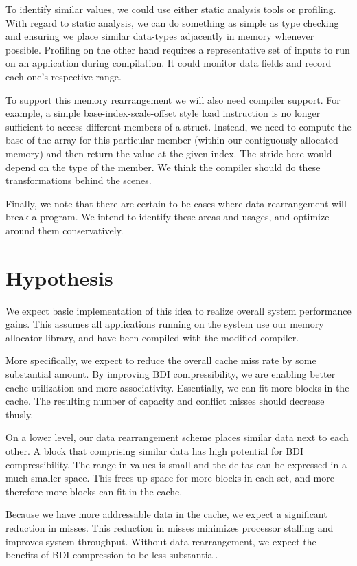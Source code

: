 \documentclass[pageno]{jpaper}
\begin{document}
To identify similar values, we could use either static analysis tools or profiling. With regard to static analysis, we can do something as simple as type checking and ensuring we place similar data-types adjacently in memory whenever possible. Profiling on the other hand requires a representative set of inputs to run on an application during compilation. It could monitor data fields and record each one's respective range.

To support this memory rearrangement we will also need compiler support. For example, a simple base-index-scale-offset style load instruction is no longer sufficient to access different members of a struct. Instead, we need to compute the base of the array for this particular member (within our contiguously allocated memory) and then return the value at the given index. The stride here would depend on the type of the member. We think the compiler should do these transformations behind the scenes.

Finally, we note that there are certain to be cases where data rearrangement will break a program. We intend to identify these areas and usages, and optimize around them conservatively.

\section{Hypothesis}
We expect basic implementation of this idea to realize overall system performance gains. This assumes all applications running on the system use our memory allocator library, and have been compiled with the modified compiler.

More specifically, we expect to reduce the overall cache miss rate by some substantial amount. By improving BDI compressibility, we are enabling better cache utilization and more associativity. Essentially, we can fit more blocks in the cache. The resulting number of capacity and conflict misses should decrease thusly.

On a lower level, our data rearrangement scheme places similar data next to each other. A block that comprising similar data has high potential for BDI compressibility. The range in values is small and the deltas can be expressed in a much smaller space. This frees up space for more blocks in each set, and more therefore more blocks can fit in the cache.

Because we have more addressable data in the cache, we expect a significant reduction in misses. This reduction in misses minimizes processor stalling and improves system throughput. Without data rearrangement, we expect the benefits of BDI compression to be less substantial.
\end{document}
